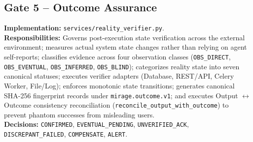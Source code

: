 \documentclass[11pt,a4paper]{article}
\newcommand{\fp}[1]{\texttt{\scriptsize #1}}
\begin{document}
\subsection{Gate 5 -- Outcome Assurance}
\textbf{Implementation:} \fp{services/reality\_verifier.py}.\\
\textbf{Responsibilities:} Governs post-execution state verification across the external environment; measures actual system state changes rather than relying on agent self-reports; classifies evidence across four observation classes (\texttt{OBS\_DIRECT}, \texttt{OBS\_EVENTUAL}, \texttt{OBS\_INFERRED}, \texttt{OBS\_BLIND}); categorizes reality state into seven canonical statuses; executes verifier adapters (Database, REST/API, Celery Worker, File/Log); enforces monotonic state transitions; generates canonical SHA-256 fingerprint records under \texttt{mirage.outcome.v1}; and executes Output $\leftrightarrow$ Outcome consistency reconciliation (\texttt{reconcile\_output\_with\_outcome}) to prevent phantom successes from misleading users.\\
\textbf{Decisions:} \texttt{CONFIRMED}, \texttt{EVENTUAL\_PENDING}, \texttt{UNVERIFIED\_ACK}, \texttt{DISCREPANT\_FAILED}, \texttt{COMPENSATE}, \texttt{ALERT}.
\end{document}
